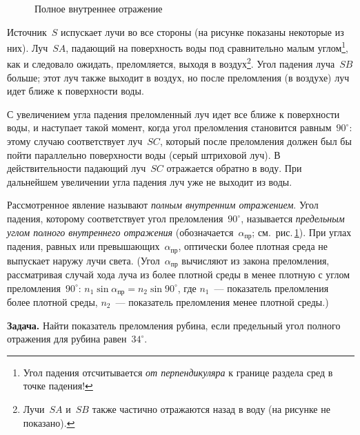\documentclass[main.tex]{subfiles}
\begin{document}
\begin{figure}[H]
\caption{Полное внутреннее отражение}
\label{fig:p179}
\end{figure}

Источник~$S$ испускает лучи во все стороны (на рисунке показаны некоторые из них). Луч~$SA$, падающий на поверхность воды под сравнительно малым углом\footnote{Угол падения отсчитывается \emph{от перпендикуляра} к границе раздела сред в точке падения!}, как и следовало ожидать, преломляется, выходя в воздух\footnote{Лучи~$SA$ и~$SB$  также частично отражаются назад в воду (на рисунке не показано).}. Угол падения луча~$SB$ больше; этот луч также выходит в воздух, но после преломления (в воздухе) луч идет ближе к поверхности воды. 

С увеличением угла падения преломленный луч идет все ближе к поверхности воды, и наступает такой момент, когда угол преломления становится равным~$90^\circ$: этому случаю соответствует луч~$SC$, который после преломления должен был бы пойти параллельно поверхности воды (серый штриховой луч). В действительности падающий луч~$SC$ отражается обратно в воду. При дальнейшем увеличении угла падения луч уже не выходит из воды.

Рассмотренное явление называют \emph{полным внутренним отражением}. Угол падения, которому соответствует угол преломления~$90^\circ$, называется \emph{предельным углом полного внутреннего отражения} (обозначается~$\alpha_\text{пр}$; см.~рис.\,\ref{fig:p179}). При углах падения, равных или превышающих~$\alpha_\text{пр}$, оптически более плотная среда не выпускает наружу лучи света. (Угол~$\alpha_\text{пр}$ вычисляют из закона преломления, рассматривая случай хода луча из более плотной среды в менее плотную с углом преломления~$90^\circ$: $n_1\sin\alpha_\text{пр}=n_2\sin90^\circ$, где $n_1$~--- показатель преломления более плотной среды, $n_2$~--- показатель преломления менее плотной среды.)

\medskip

\noindent\textbf{Задача.} Найти показатель преломления рубина, если предельный угол полного отражения для рубина равен~$34^\circ$.
\end{document}
